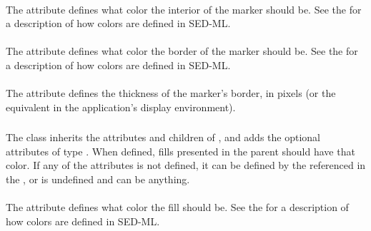 \paragraph*{}

The  attribute defines what color the interior of the marker should be.  See the \SedColor for a description of how colors are defined in SED-ML.

\paragraph*{}

The  attribute defines what color the border of the marker should be.  See the \SedColor for a description of how colors are defined in SED-ML.

\paragraph*{}

The  attribute defines the thickness of the marker's border, in pixels (or the equivalent in the application's display environment).



\subsubsection{}
\label{class:fill}

The \Fill class inherits the attributes and children of \SedBase, and adds the optional attributes  of type \SedColor.  When defined, fills presented in the parent \Style should have that color.  If any of the attributes is not defined, it can be defined by the \Style referenced in the , or is undefined and can be anything.

\paragraph*{}

The  attribute defines what color the fill should be.  See the \SedColor for a description of how colors are defined in SED-ML.

